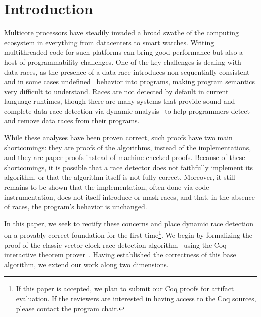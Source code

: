 \documentclass[preprint, 10pt]{sigplanconf}
\begin{document}

\section{Introduction}

Multicore processors have steadily invaded a broad swathe of the computing ecosystem in everything from datacenters to smart watches. Writing multithreaded code for such platforms can bring good performance but also a host of programmability challenges. One of the key challenges is dealing with data races, as the presence of a data race introduces non-sequentially-consistent~\cite{manson_java_2005} and in some cases undefined~\cite{boehm_foundations_2008} behavior into programs, making program semantics very difficult to understand. Races are not detected by default in current language runtimes, though there are many systems that provide sound and complete data race detection via dynamic analysis~\cite{djit+,fasttrack,slimstate} to help programmers detect and remove data races from their programs. 

While these analyses have been proven correct, such proofs have two main shortcomings: they are proofs of the algorithms, instead of the implementations, and they are paper proofs instead of machine-checked proofs. Because of these shortcomings, it is possible that a race detector does not faithfully implement its algorithm, or that the algorithm itself is not fully correct. Moreover, it still remains to be shown that the implementation, often done via code instrumentation, does not itself introduce or mask races, and that, in the absence of races, the program's behavior is unchanged.

In this paper, we seek to rectify these concerns and place dynamic race detection on a provably correct foundation for the first time\footnote{If this paper is accepted, we plan to submit our Coq proofs for artifact evaluation. If the reviewers are interested in having access to the Coq sources, please contact the program chair.}. We begin by formalizing the proof of the classic vector-clock race detection algorithm~\cite{vcfidge,vcmattern} using the Coq interactive theorem prover~\cite{coq}. Having established the correctness of this base algorithm, we extend our work along two dimensions. 
\end{document}
